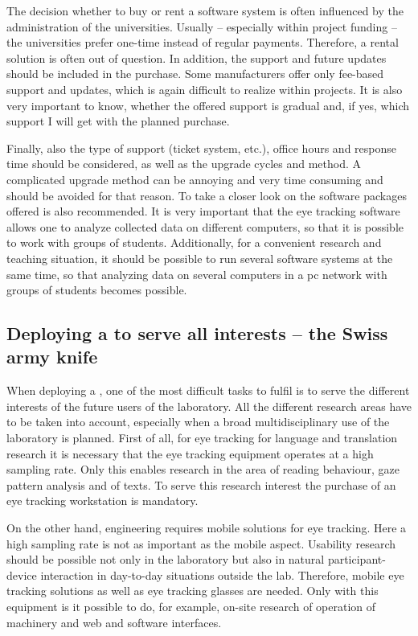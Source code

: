 \documentclass[output=paper]{langsci/langscibook}
\begin{document}
The decision whether to buy or rent a software system is often influenced by the administration of the universities. Usually -- especially within project funding -- the universities prefer one-time instead of regular payments. Therefore, a rental solution is often out of question. In addition, the support and future updates should be included in the purchase. Some manufacturers offer only fee-based support and updates, which is again difficult to realize within projects. It is also very important to know, whether the offered support is gradual and, if yes, which support I will get with the planned purchase.


Finally, also the type of support (ticket system, etc.), office hours and response time should be considered, as well as the upgrade cycles and method. A complicated upgrade method can be annoying and very time consuming and should be avoided for that reason. To take a closer look on the software packages offered is also recommended. It is very important that the eye tracking software allows one to analyze collected data on different computers, so that it is possible to work with groups of students. Additionally, for a convenient research and teaching situation, it should be possible to run several software systems at the same time, so that analyzing data on several computers in a pc network with groups of students becomes possible.


\subsection{Deploying a  to serve all interests -- the Swiss army knife }

When deploying a , one of the most difficult tasks to fulfil is to serve the different interests of the future users of the laboratory. All the different research areas have to be taken into account, especially when a broad multidisciplinary use of the laboratory is planned. First of all, for eye tracking for language and translation research it is necessary that the eye tracking equipment operates at a high sampling rate. Only this enables research in the area of reading behaviour, gaze pattern analysis and  of texts. To serve this research interest the purchase of an eye tracking workstation is mandatory.


On the other hand,  engineering requires mobile solutions for eye tracking. Here a high sampling rate is not as important as the mobile aspect. Usability research should be possible not only in the laboratory but also in natural participant-device interaction in day-to-day situations outside the  lab. Therefore, mobile eye tracking solutions as well as eye tracking glasses are needed. Only with this equipment is it possible to do, for example, on-site research of operation of machinery and web and software interfaces. 
\end{document}
